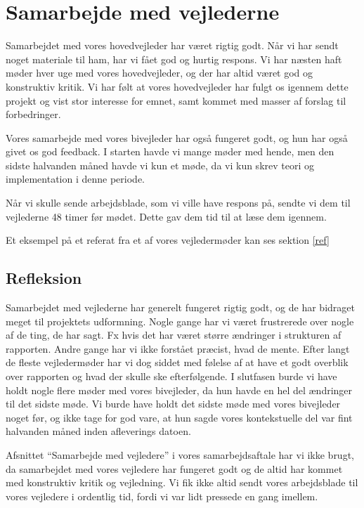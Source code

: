\section{Samarbejde med vejlederne}
\label{H8R}

Samarbejdet med vores hovedvejleder har v\ae{}ret rigtig godt. 
N\aa{}r vi har sendt noget materiale til ham, har vi f\aa{}et god og hurtig respons. 
Vi har n\ae{}sten haft m\o{}der hver uge med vores hovedvejleder, og der har altid v\ae{}ret god og
konstruktiv kritik. 
Vi har f\o{}lt at vores hovedvejleder har fulgt os igennem dette projekt og vist stor interesse for emnet, samt kommet med masser af forslag til forbedringer.

Vores samarbejde med vores bivejleder har ogs\aa{} fungeret godt, og hun har ogs\aa{} givet os god feedback. 
I starten havde vi mange m\o{}der med hende, men den sidste halvanden m\aa{}ned havde vi kun et m\o{}de, da vi kun skrev teori og implementation i denne periode.

N\aa{}r vi skulle sende arbejdsblade, som vi ville have respons p\aa{}, sendte vi dem til vejlederne 48 timer f\o{}r m\o{}det. Dette gav dem tid til at l\ae{}se dem igennem.

Et eksempel p\aa{} et referat fra et af vores vejlederm\o{}der kan ses sektion \ref{ref}

\subsection{Refleksion}
Samarbejdet med vejlederne har generelt fungeret rigtig godt, og de har bidraget meget til projektets udformning. 
Nogle gange har vi v\ae{}ret frustrerede over nogle af de ting, de har sagt. 
Fx hvis det har v\ae{}ret st\o{}rre \ae{}ndringer i strukturen af rapporten. Andre gange har vi ikke forst\aa{}et pr\ae{}cist, hvad de
mente. 
Efter langt de fleste vejlederm\o{}der har vi dog siddet med f\o{}lelse af at have et godt overblik over rapporten og hvad der skulle ske efterf\o{}lgende. 
I slutfasen burde vi have holdt nogle flere m\o{}der med vores bivejleder, da hun havde en hel del \ae{}ndringer til det sidste m\o{}de. Vi burde have holdt det sidste m\o{}de med vores bivejleder noget f\o{}r, og ikke tage for god vare, at hun sagde vores kontekstuelle del var fint halvanden m\aa{}ned inden afleverings datoen.


Afsnittet ``Samarbejde med vejledere'' i vores samarbejdsaftale har vi ikke brugt, da samarbejdet med vores vejledere har fungeret godt og de altid har kommet med konstruktiv kritik og vejledning. 
Vi fik ikke altid sendt vores arbejdsblade til vores vejledere i ordentlig tid, fordi vi var lidt pressede en gang imellem.

